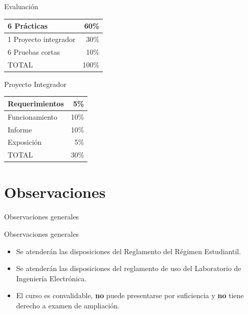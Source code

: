 \documentclass[handout,xcolor=dvipsnames]{beamer}
\newcommand{\pageframe}[1]{\frame{\begin{center}{ \Huge #1 }\end{center}}}
\begin{document}
\begin{frame}{Evaluación}
\begin{center}
\begin{tabular}{|l|r|}\hline
	6 Prácticas				&	60\%\\\hline
	1 Proyecto integrador	&	30\%\\\hline
	6 Pruebas cortas		&	10\%\\\hline\hline
	TOTAL					&	100\%\\\hline
\end{tabular}
\end{center}
\end{frame}

\begin{frame}{Proyecto Integrador}
\begin{center}
\begin{tabular}{|l|r|}\hline
	Requerimientos				&	5\%\\\hline
	Funcionamiento				&	10\%\\\hline
	Informe						&	10\%\\\hline
	Exposición					&	5\%\\\hline\hline
	TOTAL						&	30\%\\\hline
\end{tabular}
\end{center}
\end{frame}

\section{Observaciones}

\pageframe{Observaciones}

\begin{frame}{Observaciones generales}
  \begin{block}{Observaciones generales}
    \begin{itemize}[<+->]
      \item Se atenderán las disposiciones del Reglamento del Régimen Estudiantil.
      \item Se atenderán las disposiciones del reglamento de uso del Laboratorio de Ingeniería Electrónica.
      \item El curso es convalidable, \textbf{no} puede presentarse por suficiencia y \textbf{no} tiene derecho a examen de ampliación.
    \end{itemize}
  \end{block}
\end{frame}
\end{document}
